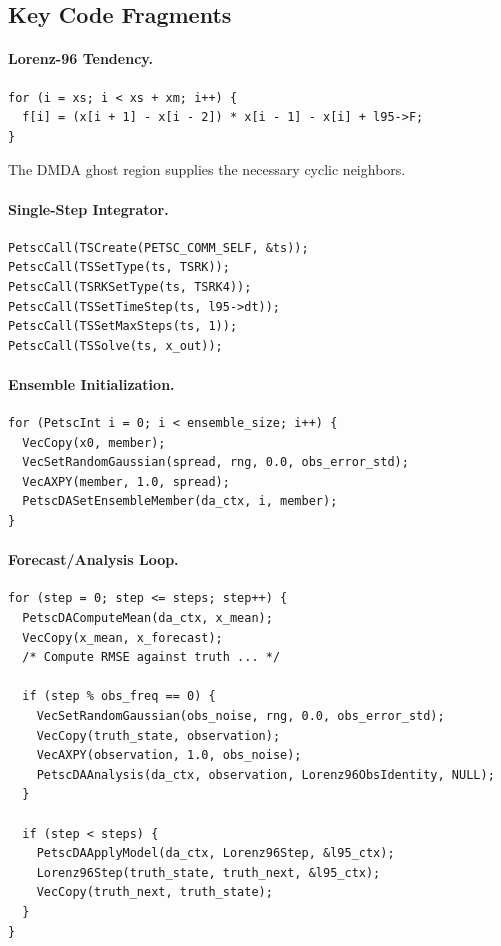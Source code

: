 \documentclass[11pt]{article}
\begin{document}
\subsection{Key Code Fragments}

\paragraph{Lorenz-96 Tendency.}
\begin{lstlisting}
for (i = xs; i < xs + xm; i++) {
  f[i] = (x[i + 1] - x[i - 2]) * x[i - 1] - x[i] + l95->F;
}
\end{lstlisting}
The DMDA ghost region supplies the necessary cyclic neighbors.

\paragraph{Single-Step Integrator.}
\begin{lstlisting}
PetscCall(TSCreate(PETSC_COMM_SELF, &ts));
PetscCall(TSSetType(ts, TSRK));
PetscCall(TSRKSetType(ts, TSRK4));
PetscCall(TSSetTimeStep(ts, l95->dt));
PetscCall(TSSetMaxSteps(ts, 1));
PetscCall(TSSolve(ts, x_out));
\end{lstlisting}

\paragraph{Ensemble Initialization.}
\begin{lstlisting}
for (PetscInt i = 0; i < ensemble_size; i++) {
  VecCopy(x0, member);
  VecSetRandomGaussian(spread, rng, 0.0, obs_error_std);
  VecAXPY(member, 1.0, spread);
  PetscDASetEnsembleMember(da_ctx, i, member);
}
\end{lstlisting}

\paragraph{Forecast/Analysis Loop.}
\begin{lstlisting}
for (step = 0; step <= steps; step++) {
  PetscDAComputeMean(da_ctx, x_mean);
  VecCopy(x_mean, x_forecast);
  /* Compute RMSE against truth ... */

  if (step % obs_freq == 0) {
    VecSetRandomGaussian(obs_noise, rng, 0.0, obs_error_std);
    VecCopy(truth_state, observation);
    VecAXPY(observation, 1.0, obs_noise);
    PetscDAAnalysis(da_ctx, observation, Lorenz96ObsIdentity, NULL);
  }

  if (step < steps) {
    PetscDAApplyModel(da_ctx, Lorenz96Step, &l95_ctx);
    Lorenz96Step(truth_state, truth_next, &l95_ctx);
    VecCopy(truth_next, truth_state);
  }
}
\end{lstlisting}
\end{document}
